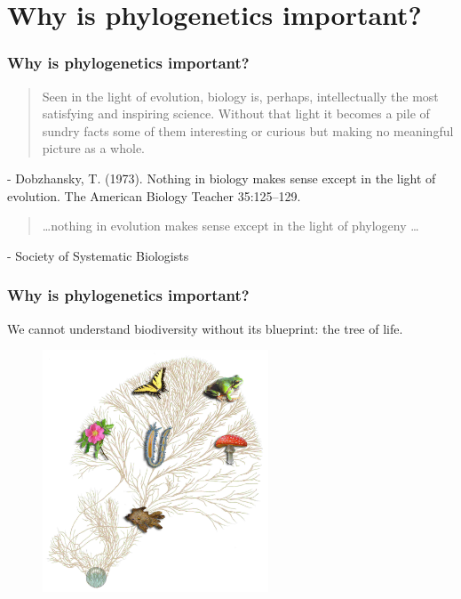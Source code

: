 \section{Why is phylogenetics important?}

\begin{frame}
    \frametitle{Why is phylogenetics important?}
    \begin{quote}
    Seen in the light of evolution, biology is, perhaps, intellectually the
    most satisfying and inspiring science. Without that light it becomes a pile
    of sundry facts some of them interesting or curious but making no
    meaningful picture as a whole.
    \end{quote}

    \myHangIndent
    - Dobzhansky, T. (1973). Nothing in biology makes sense except in the light
    of evolution. The American Biology Teacher 35:125--129.

    \bigskip

    \begin{quote}
    \ldots nothing in evolution makes sense except in the light of phylogeny \ldots
    \end{quote}

    \myHangIndent
    - Society of Systematic Biologists
\end{frame}

\begin{frame}
    \frametitle{Why is phylogenetics important?}
    We cannot understand biodiversity without its blueprint: the tree of life.
    \begin{figure}
        \begin{center}
        \includegraphics[width=0.6\textwidth]{../images/treeoflife.jpg}
        \end{center}
    \end{figure}
\end{frame}

